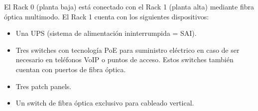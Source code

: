 El Rack 0 (planta baja) está conectado con el Rack 1 (planta alta) mediante fibra óptica multimodo. El Rack 1 cuenta con los siguientes dispositivos:
\begin{itemize}
	\item Una UPS (sistema de alimentación ininterrumpida = SAI).
	\item Tres switches con tecnología PoE para suministro eléctrico en caso de ser necesario en teléfonos VoIP o puntos de acceso. Estos switches también cuentan con puertos de fibra óptica.
	\item Tres patch panels.
	\item Un switch de fibra óptica exclusivo para cableado vertical.
\end{itemize}